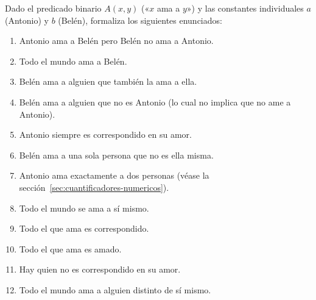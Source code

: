 \begin{pregunta}\label{e5-2}
Dado el predicado binario $A(x, y)$ («$x$ ama a $y$») y las constantes individuales $a$ (Antonio) y $b$ (Belén), formaliza los siguientes enunciados:
\begin{enumerate}
    \item Antonio ama a Belén pero Belén no ama a Antonio.
    \item Todo el mundo ama a Belén.
    \item Belén ama a alguien que también la ama a ella.
    \item Belén ama a alguien que no es Antonio (lo cual no implica que no ame a Antonio).
    \item Antonio siempre es correspondido en su amor.
    \item Belén ama a una sola persona que no es ella misma.
    \item Antonio ama exactamente a dos personas (véase la sección~\ref{sec:cuantificadores-numericos}).
    \item Todo el mundo se ama a sí mismo.
    \item Todo el que ama es correspondido.
    \item Todo el que ama es amado.
    \item Hay quien no es correspondido en su amor.
    \item Todo el mundo ama a alguien distinto de sí mismo.
\end{enumerate}
\end{pregunta}

